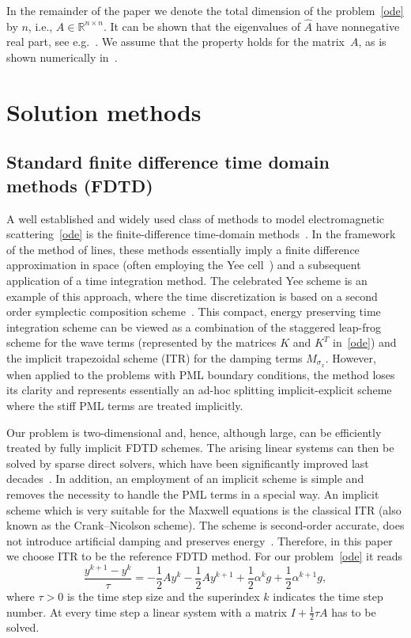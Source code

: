 \documentclass[11pt]{elsarticle}
\newcommand{\Ahat}{\widehat{A}}
\newcommand{\Rr}{\mathbb{R}}
\begin{document}
In the remainder of the paper we denote the total dimension of the 
problem~\eqref{ode} by $n$, i.e., $A\in\Rr^{n\times n}$.  
It can be shown that the eigenvalues of $\Ahat$ have nonnegative 
real part, see e.g.~\cite{BotchevVerwer09}.
We assume that the property holds for the matrix~$A$,
as is shown numerically in~\cite{Botchev2016}.

\section{Solution methods}
\label{sect:solvers}

\subsection{Standard finite difference time domain methods (FDTD)}
A well established and widely used class of methods to 
model electromagnetic scattering~\eqref{ode} is the finite-difference 
time-domain
methods~\cite{Taflove}.  In the framework of the method of lines,
these methods essentially imply a finite difference approximation
in space (often employing the Yee cell~\cite{Yee66}) and 
a subsequent application of a time integration method.
The celebrated Yee scheme is an example of this approach,
where the time discretization is based on a second order
symplectic composition scheme~\cite{BotchevVerwer09}.
This compact, energy preserving time integration scheme can 
be viewed as a combination of the staggered leap-frog scheme for the wave
terms (represented by the matrices $K$ and $K^T$ in~\eqref{ode})
and the implicit trapezoidal scheme (ITR) for the damping
terms $M_{\sigma_{x}}$.  However, when applied to the problems
with PML boundary conditions, the method loses its clarity
and represents essentially an ad-hoc splitting implicit-explicit scheme 
where the stiff PML terms are treated implicitly.

Our problem is two-dimensional and, hence, although large, can 
be efficiently treated by fully implicit FDTD schemes.  The arising
linear systems can then be solved by sparse direct solvers,
which have been significantly improved last 
decades~\cite{UMFPACK1,UMFPACK2,Duff_ea2017book}.
In addition, an employment of an implicit scheme is simple 
and removes the necessity to handle the PML terms in
a special way.  An implicit scheme which is very suitable
for the Maxwell equations is the classical ITR 
(also known as the Crank--Nicolson scheme).  
The scheme is second-order accurate, does not introduce artificial
damping and preserves energy~\cite{VerwerBotchev09}.
Therefore, in this paper we choose ITR to be the reference FDTD 
method. 
For our problem~\eqref{ode}
it reads
$$
\frac{y^{k+1} - y^{k}}{\tau} = 
-\frac12 A y^k -\frac12 A y^{k+1} 
+ \frac12 {\alpha^k}g  
+ \frac12 {\alpha^{k+1}}g,
$$
where $\tau>0$ is the time step size and the superindex $k$
indicates the time step number.
At every time step a linear system with a matrix
$I+\frac12\tau A$ has to be solved.
\end{document}
